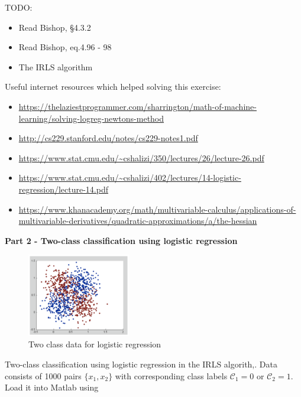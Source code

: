 \documentclass[a4paper]{article}
\begin{document}
TODO:

\begin{itemize}
	\item Read Bishop, §4.3.2
	\item Read Bishop, eq.4.96 - 98
	\item The IRLS algorithm
\end{itemize}


Useful internet resources which helped solving this exercise:

\begin{itemize}
	\item \url{https://thelaziestprogrammer.com/sharrington/math-of-machine-learning/solving-logreg-newtons-method}
	\item \url{http://cs229.stanford.edu/notes/cs229-notes1.pdf}
	\item \url{https://www.stat.cmu.edu/~cshalizi/350/lectures/26/lecture-26.pdf}
	\item \url{https://www.stat.cmu.edu/~cshalizi/402/lectures/14-logistic-regression/lecture-14.pdf}
	\item \url{https://www.khanacademy.org/math/multivariable-calculus/applications-of-multivariable-derivatives/quadratic-approximations/a/the-hessian}
\end{itemize}




\textbf{Part 2 - Two-class classification using logistic regression}\\

\begin{figure}[H]
\center
\includegraphics[width=0.4\textwidth]{Images/two-class-dataset.png}
\caption{Two class data for logistic regression}
\label{Fig:two-class-dataset}
\end{figure}

Two-class classification using logistic regression in the IRLS algorith,. Data consists of 1000 pairs $\{ x_1, x_2 \}$ with corresponding class labels $\mathcal{C}_1 = 0$ or $\mathcal{C}_2 = 1$. Load it into Matlab using\\
\end{document}

